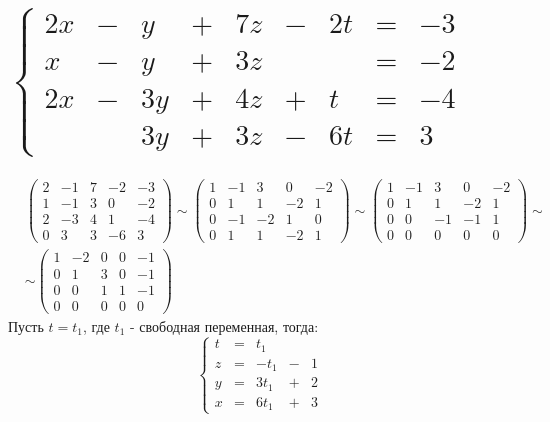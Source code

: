 \documentclass[12pt]{article}
\begin{document}
\begin{sloppypar}
    \section{$
          \left\{\begin{array}{rcrcrcrcr}
              2x & - & y  & + & 7z & - & 2t & = & -3 \\
              x  & - & y  & + & 3z &   &    & = & -2 \\
              2x & - & 3y & + & 4z & + & t  & = & -4 \\
                 &   & 3y & + & 3z & - & 6t & = & 3
          \end{array}\right.
      $}
    \begin{align*}
         & \left(\begin{array}{rrrr|r}
                     2 & -1 & 7 & -2 & -3 \\
                     1 & -1 & 3 & 0  & -2 \\
                     2 & -3 & 4 & 1  & -4 \\
                     0 & 3  & 3 & -6 & 3
                 \end{array}\right)
        \sim
        \left(\begin{array}{rrrr|r}
                  1 & -1 & 3  & 0  & -2 \\
                  0 & 1  & 1  & -2 & 1  \\
                  0 & -1 & -2 & 1  & 0  \\
                  0 & 1  & 1  & -2 & 1
              \end{array}\right)
        \sim
        \left(\begin{array}{rrrr|r}
                  1 & -1 & 3  & 0  & -2 \\
                  0 & 1  & 1  & -2 & 1  \\
                  0 & 0  & -1 & -1 & 1  \\
                  0 & 0  & 0  & 0  & 0
              \end{array}\right)
        \sim                          \\
         & \sim
        \left(\begin{array}{rrrr|r}
                  1 & -2 & 0 & 0 & -1 \\
                  0 & 1  & 3 & 0 & -1 \\
                  0 & 0  & 1 & 1 & -1 \\
                  0 & 0  & 0 & 0 & 0
              \end{array}\right)
    \end{align*}
    Пусть $t = t_1$, где $t_1$ - свободная переменная, тогда:
    \[
        \left\{\begin{array}{rcrcl}
            t & = & t_1          \\
            z & = & -t_1 & - & 1 \\
            y & = & 3t_1 & + & 2 \\
            x & = & 6t_1 & + & 3
        \end{array}\right.
    \]


\end{sloppypar}
\end{document}
